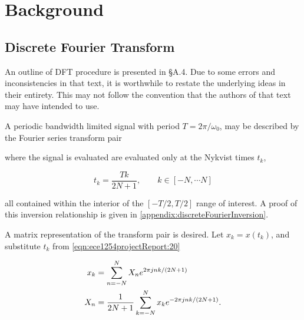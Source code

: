 \section{Background}
\subsection{Discrete Fourier Transform}

An outline of DFT procedure is presented in \citep{giannini2004NonlinearMicrowaveCircuitDesign} \S A.4.  Due to some errors and inconsistencies in that text, it is worthwhile to restate the underlying ideas in their entirety.  This may not follow the convention that the authors of that text may have intended to use.

A periodic bandwidth limited signal with period \( T = 2 \pi/\omega_0 \), may be described by the Fourier series transform pair


where the signal is evaluated are evaluated only at the Nykvist times
\( t_k \),

\begin{equation}\label{eqn:ece1254projectReport:20}
t_k = \frac{T k}{2 N + 1}, \qquad k \in [-N, \cdots N]
\end{equation}

all contained within the interior of the \( [-T/2, T/2] \) range of interest.
A proof of this inversion relationship is given in \cref{appendix:discreteFourierInversion}.

A matrix representation of the transform pair is desired.
Let \( x_k = x(t_k) \), and
substitute \( t_k \) from \cref{eqn:ece1254projectReport:20}

\begin{equation}\label{eqn:ece1254projectReport:140}
\begin{aligned}
x_k &= \sum_{n = -N}^N X_n e^{ 2 \pi j n k /(2 N + 1)} \\
X_n &= \inv{2 N + 1} \sum_{k = -N}^N x_k e^{- 2 \pi j n k /(2 N + 1)}.
\end{aligned}
\end{equation}

